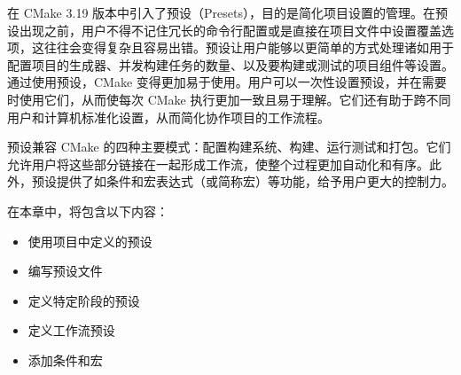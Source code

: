 在 CMake 3.19 版本中引入了预设（Presets），目的是简化项目设置的管理。在预设出现之前，用户不得不记住冗长的命令行配置或是直接在项目文件中设置覆盖选项，这往往会变得复杂且容易出错。预设让用户能够以更简单的方式处理诸如用于配置项目的生成器、并发构建任务的数量、以及要构建或测试的项目组件等设置。通过使用预设，CMake 变得更加易于使用。用户可以一次性设置预设，并在需要时使用它们，从而使每次 CMake 执行更加一致且易于理解。它们还有助于跨不同用户和计算机标准化设置，从而简化协作项目的工作流程。

预设兼容 CMake 的四种主要模式：配置构建系统、构建、运行测试和打包。它们允许用户将这些部分链接在一起形成工作流，使整个过程更加自动化和有序。此外，预设提供了如条件和宏表达式（或简称宏）等功能，给予用户更大的控制力。

在本章中，将包含以下内容：

\begin{itemize}
\item
使用项目中定义的预设

\item
编写预设文件

\item
定义特定阶段的预设

\item
定义工作流预设

\item
添加条件和宏
\end{itemize}


